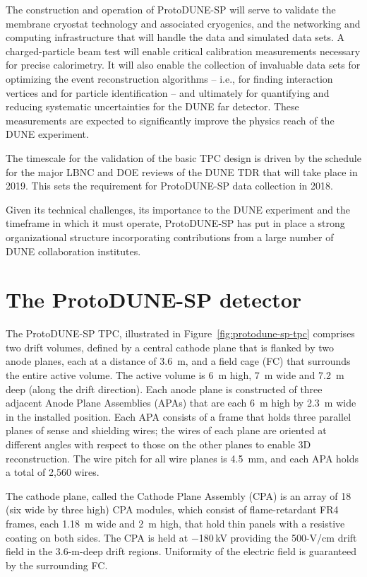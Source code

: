 The construction and operation of ProtoDUNE-SP will serve to validate the membrane cryostat technology and associated cryogenics, and the networking and computing infrastructure that will handle the data and simulated data sets.
A charged-particle beam test will enable critical calibration measurements necessary for precise calorimetry. It will also enable the collection of invaluable data sets for optimizing the event reconstruction algorithms -- i.e., for finding interaction vertices and for particle identification -- and ultimately for quantifying and reducing systematic uncertainties for the DUNE far detector. These measurements are expected to significantly improve the physics reach of the DUNE experiment.

The timescale for the validation of the basic TPC design is driven by the schedule for the major LBNC and DOE reviews of the DUNE TDR that will take place in 2019. This sets the requirement for ProtoDUNE-SP data collection in 2018. 

Given its technical challenges, its importance to the DUNE experiment and the timeframe in which it must operate, ProtoDUNE-SP has put in place a strong organizational structure incorporating 
contributions from a large number of DUNE collaboration institutes. 

\section{The ProtoDUNE-SP detector}
\label{intro:detector}

The ProtoDUNE-SP TPC, illustrated in Figure~\ref{fig:protodune-sp-tpc} comprises two drift volumes, defined by  a central cathode plane that is flanked by two anode planes, each at a distance of 3.6~m, and a field cage (FC) that surrounds the entire active volume. The active volume is 6~m high, 7~m wide and 7.2~m deep (along the drift direction).
Each anode plane is constructed of three adjacent Anode Plane Assemblies (APAs) that are each 6~m high by 2.3~m wide in the installed position. Each APA consists of a frame that holds three parallel planes of sense and shielding wires; the wires of each plane are
oriented at different angles with respect to those on the other planes to enable 3D reconstruction.  The wire pitch for all wire planes is 4.5~mm, and each APA holds a total of 2,560 wires. 

The cathode plane, called the Cathode Plane Assembly (CPA) is an array of 18 (six wide by three high) CPA modules, which consist of  flame-retardant FR4 frames, each 1.18~m wide and 2~m high, that hold thin panels with a resistive coating on both sides. 
The CPA is held at $-$180\,kV providing the 500-V/cm drift field in the 3.6-m-deep drift regions. 
Uniformity of the electric field is guaranteed by the surrounding FC.
 
